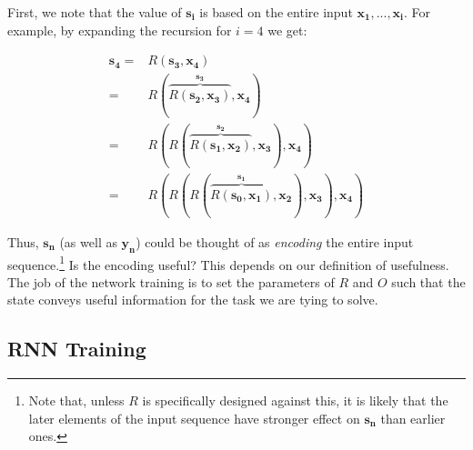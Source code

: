 \documentclass[jair,twoside,11pt,theapa]{article}
\newcommand{\m}[1]{\mathbf{#1}}%
\begin{document}
{First, we note that the value of $\m{s_i}$ is based on the entire input $\m{x_1},...,\m{x_i}$. 
For example, by expanding the recursion for $i=4$ we get:


\begin{align*}
    \m{s_{4}}   =& R(\m{s_3},\m{x_4}) \\
                =& R(\overbrace{R(\m{s_2},\m{x_3})}^{\m{s_3}},\m{x_4}) \\
                =& R(R(\overbrace{R(\m{s_1},\m{x_2})}^{\m{s_2}},\m{x_3}),\m{x_4}) \\
                =&
                R(R(R(\overbrace{R(\m{s_0},\m{x_1})}^{\m{s_1}},\m{x_2}),\m{x_3}),\m{x_4})
\end{align*}


Thus, $\m{s_n}$ (as well as $\m{y_n}$) could be thought of as \emph{encoding} the entire input
sequence.\footnote{Note that, unless $R$ is specifically designed against this,
it is likely that the later elements of the input sequence have stronger effect
on $\m{s_n}$ than earlier ones.}
Is the encoding useful? This depends on our definition of usefulness. The job of
the network training is to set the parameters of $R$ and $O$ such that the state
conveys useful information for the task we are tying to solve.


\subsection{RNN Training}

}
\end{document}
